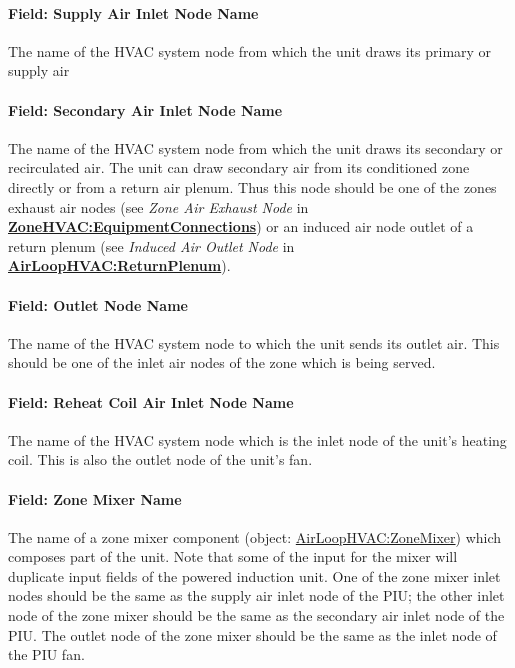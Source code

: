 \paragraph{Field: Supply Air Inlet Node Name}\label{field-supply-air-inlet-node-name}

The name of the HVAC system node from which the unit draws its primary or supply air

\paragraph{Field: Secondary Air Inlet Node Name}\label{field-secondary-air-inlet-node-name}

The name of the HVAC system node from which the unit draws its secondary or recirculated air. The unit can draw secondary air from its conditioned zone directly or from a return air plenum. Thus this node should be one of the zones exhaust air nodes (see \emph{Zone Air Exhaust Node} in \textbf{\hyperref[zonehvacequipmentconnections]{ZoneHVAC:EquipmentConnections}}) or an induced air node outlet of a return plenum (see \emph{Induced Air Outlet Node} in \textbf{\hyperref[airloophvacreturnplenum]{AirLoopHVAC:ReturnPlenum}}).

\paragraph{Field: Outlet Node Name}\label{field-outlet-node-name}

The name of the HVAC system node to which the unit sends its outlet air. This should be one of the inlet air nodes of the zone which is being served.

\paragraph{Field: Reheat Coil Air Inlet Node Name}\label{field-reheat-coil-air-inlet-node-name}

The name of the HVAC system node which is the inlet node of the unit's heating coil. This is also the outlet node of the unit's fan.

\paragraph{Field: Zone Mixer Name}\label{field-zone-mixer-name}

The name of a zone mixer component (object: \hyperref[airloophvaczonemixer]{AirLoopHVAC:ZoneMixer}) which composes part of the unit. Note that some of the input for the mixer will duplicate input fields of the powered induction unit. One of the zone mixer inlet nodes should be the same as the supply air inlet node of the PIU; the other inlet node of the zone mixer should be the same as the secondary air inlet node of the PIU. The outlet node of the zone mixer should be the same as the inlet node of the PIU fan.


